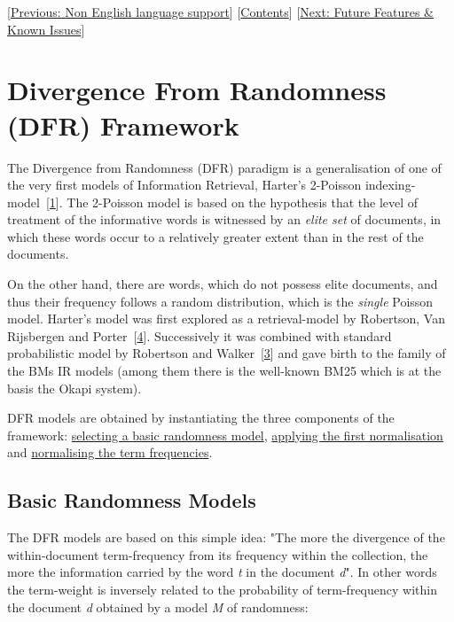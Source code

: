 {[}\href{languages.html}{Previous: Non English language support}{]}
{[}\href{index.html}{Contents}{]} {[}\href{todo.html}{Next: Future
Features \& Known Issues}{]}

\section{Divergence From Randomness (DFR)
Framework}\label{divergence-from-randomness-dfr-framework}

The Divergence from Randomness (DFR) paradigm is a generalisation of one
of the very first models of Information Retrieval, Harter's 2-Poisson
indexing-model~{[}\protect\hyperlink{1}{1}{]}. The 2-Poisson model is
based on the hypothesis that the level of treatment of the informative
words is witnessed by an \emph{elite set} of documents, in which these
words occur to a relatively greater extent than in the rest of the
documents.

On the other hand, there are words, which do not possess elite
documents, and thus their frequency follows a random distribution, which
is the \emph{single} Poisson model. Harter's model was first explored as
a retrieval-model by Robertson, Van Rijsbergen and
Porter~{[}\protect\hyperlink{4}{4}{]}. Successively it was combined with
standard probabilistic model by Robertson and
Walker~{[}\protect\hyperlink{3}{3}{]} and gave birth to the family of
the BMs IR models (among them there is the well-known BM25 which is at
the basis the Okapi system).

DFR models are obtained by instantiating the three components of the
framework: \protect\hyperlink{randomnessmodel}{selecting a basic
randomness model}, \protect\hyperlink{firstnorm}{applying the first
normalisation} and \protect\hyperlink{freqnormalisation}{normalising the
term frequencies}.

\href{}{}

\subsection{Basic Randomness Models}\label{basic-randomness-models}

The DFR models are based on this simple idea: "The more the divergence
of the within-document term-frequency from its frequency within the
collection, the more the information carried by the word \emph{t} in the
document \emph{d}". In other words the term-weight is inversely related
to the probability of term-frequency within the document \emph{d}
obtained by a model \emph{M} of randomness:

